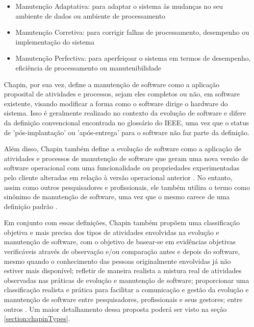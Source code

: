 \begin{itemize}
    \item Manutenção Adaptativa: para adaptar o sistema às mudanças no seu ambiente de dados ou ambiente de processamento
    \item Manutenção Corretiva: para corrigir falhas de processamento, desempenho ou implementação do sistema
    \item Manutenção Perfectiva: para aperfeiçoar o sistema em termos de desempenho, eficiência de processamento ou manutenibilidade
\end{itemize}

Chapin, por sua vez, define a manutenção de software como a aplicação proposital de atividades e 
processos, sejam eles completos ou não, em software existente, visando modificar a forma como o 
software dirige o hardware do sistema. Isso é geralmente realizado no contexto da evolução de software 
e difere da definição convencional encontrada no glossário do IEEE, uma vez que o status de 
'pós-implantação' ou 'após-entrega' para o software não faz parte da definição. 

Além disso, Chapin também define a evolução de software como a aplicação de atividades e 
processos de manutenção de software que geram uma nova versão de software operacional com uma funcionalidade 
ou propriedades experimentadas pelo cliente alteradas em relação à versão operacional anterior \cite{chapin2001types}. 
No entanto, assim como outros pesquisadores e profissionais, ele também utiliza o termo como sinônimo 
de manutenção de software, uma vez que o mesmo carece de uma definição padrão \cite{bennett2000software,chapin2001types}.

Em conjunto com essas definições, Chapin também propõem uma classificação objetiva e mais precisa dos 
tipos de atividades envolvidas na evolução e manutenção de software, com o objetivo de basear-se em 
evidências objetivas verificáveis através de observação e/ou comparação antes e depois do software, 
mesmo quando o conhecimento das pessoas originalmente envolvidas já não estiver mais disponível; 
refletir de maneira realista a mistura real de atividades observadas nas práticas de evolução e 
manutenção de software; proporcionar uma classificação realista e prática para facilitar a comunicação 
e gestão da evolução e manutenção de software entre pesquisadores, profissionais e seus gestores; 
entre outros \cite{chapin2001types}. Um maior detalhamento dessa proposta poderá ser visto na seção \ref{section:chapinTypes}.

